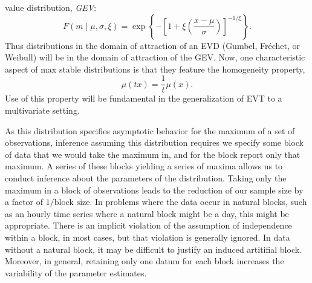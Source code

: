   value distribution, \emph{GEV}:
  \begin{equation*}
    \label{eqn:gev}
    F(m \mid \mu, \sigma, \xi) = \exp\left\lbrace-\left[1 + \xi\left(\frac{x - \mu}{\sigma}\right)\right]^{-1/{\xi}}\right\rbrace.
  \end{equation*}
  Thus distributions in the domain of attraction of an EVD (Gumbel, Fr{\'e}chet, or Weibull) will be
  in the domain of attraction of the GEV. Now, one characteristic aspect of max stable distributions
  is that they feature the homogeneity property,
  \begin{equation*}
    \mu(tx) = \frac{1}{t}\mu(x).
  \end{equation*}
  Use of this property will be fundamental in the generalization of EVT to a multivariate setting.

As this distribution specifies asymptotic behavior for the maximum of a set of observations,
  inference assuming this distribution requires we specify some block of data that we would take the
  maximum in, and for the block report only that maximum.  A series of these blocks yielding a series
  of maxima allows us to conduct inference about the parameters of the distribution.  Taking only the
  maximum in a block of observations leads to the reduction of our sample size by a factor of
  $1/\text{block size}$. In problems where the data occur in natural blocks, such as an hourly time
  series where a natural block might be a day, this might be appropriate.  There is an implicit
  violation of the assumption of independence within a block, in most cases, but that violation is
  generally ignored. In data without a natural block, it may be difficult to justify an induced
  artitifial block. Moreover, in general, retaining only one
  datum for each block increases the variability of the parameter estimates.

